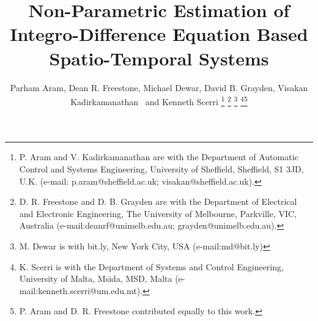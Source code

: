 \documentclass[10pt,twocolumn,twoside]{IEEEtran}
\begin{document}
%
\title{Non-Parametric Estimation of Integro-Difference Equation Based Spatio-Temporal Systems}
%
%
%

\author{Parham Aram, Dean R. Freestone, 
        Michael Dewar, David B. Grayden, Visakan Kadirkamanathan~ and Kenneth Scerri  %
\thanks{P. Aram and V. Kadirkamanathan are with the Department of Automatic Control and Systems Engineering, University of Sheffield, Sheffield, S1 3JD, U.K. (e-mail:  p.aram@sheffield.ac.uk; visakan@sheffield.ac.uk).}%
\thanks{D. R. Freestone and D. B. Grayden are with the Department of Electrical and Electronic Engineering, The University of Melbourne,
Parkville, VIC, Australia (e-mail:deanrf@unimelb.edu.au; grayden@unimelb.edu.au).}
\thanks{M. Dewar is with bit.ly, New York City, USA (e-mail:md@bit.ly)}  
\thanks{K. Scerri is with the Department of Systems and Control Engineering, University of Malta, Msida, MSD, Malta (e-mail:kenneth.scerri@um.edu.mt).}\thanks{P. Aram and D. R. Freestone contributed equally to this work.}} 





% 
%
\end{document}
